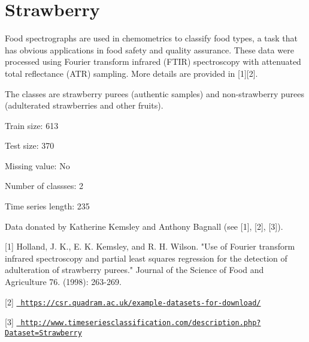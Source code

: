 \chapter{Strawberry}
\hypertarget{md_external_2data_2UCRArchive__2018_2Strawberry_2README}{}\label{md_external_2data_2UCRArchive__2018_2Strawberry_2README}
\label{md_external_2data_2UCRArchive__2018_2Strawberry_2README_autotoc_md215}%
%
 Food spectrographs are used in chemometrics to classify food types, a task that has obvious applications in food safety and quality assurance. These data were processed using Fourier transform infrared (FTIR) spectroscopy with attenuated total reflectance (ATR) sampling. More details are provided in \mbox{[}1\mbox{]}\mbox{[}2\mbox{]}.

The classes are strawberry purees (authentic samples) and non-\/strawberry purees (adulterated strawberries and other fruits).

Train size\+: 613

Test size\+: 370

Missing value\+: No

Number of classses\+: 2

Time series length\+: 235

Data donated by Katherine Kemsley and Anthony Bagnall (see \mbox{[}1\mbox{]}, \mbox{[}2\mbox{]}, \mbox{[}3\mbox{]}).

\mbox{[}1\mbox{]} Holland, J. K., E. K. Kemsley, and R. H. Wilson. "{}\+Use of Fourier transform infrared spectroscopy and partial least squares regression for the detection of adulteration of strawberry purees."{} Journal of the Science of Food and Agriculture 76. (1998)\+: 263-\/269.

\mbox{[}2\mbox{]} \href{https://csr.quadram.ac.uk/example-datasets-for-download/}{\texttt{ https\+://csr.\+quadram.\+ac.\+uk/example-\/datasets-\/for-\/download/}}

\mbox{[}3\mbox{]} \href{http://www.timeseriesclassification.com/description.php?Dataset=Strawberry}{\texttt{ http\+://www.\+timeseriesclassification.\+com/description.\+php?\+Dataset=\+Strawberry}} 